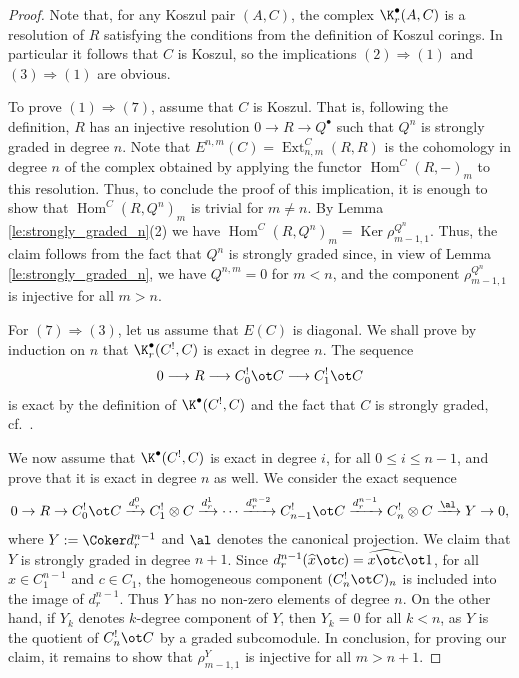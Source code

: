 \begin{proof}
Note that, for any Koszul pair $(A,C)$, the complex $\K^\bullet_r(A,C)$ is a resolution of $R$ sa\-tisfying the conditions from the def\/inition of Koszul corings. In particular it follows that $C$ is Koszul, so the implications $(2) \Longrightarrow (1)$ and $(3) \Longrightarrow (1)$ are obvious.

To prove $(1) \Longrightarrow (7)$, assume that $C$ is Koszul. That is, following the def\/inition, $R$ has an injective resolution $0 \rightarrow R \rightarrow Q^\bullet$ such that $Q^n$ is strongly graded in degree $n$. Note that $E^{n,m}(C)=\operatorname{Ext}_{n,m}^C(R,R)$ is the cohomology in degree $n$ of the complex obtained by applying the functor $\operatorname{Hom}^C(R,-)_m$ to this resolution. Thus, to conclude the proof of this implication, it is enough to show that $\operatorname{Hom}^C(R,Q^n)_m$ is trivial for $m\neq n$. By Lemma \ref{le:strongly_graded_n}(2) we have $\operatorname{Hom}^C(R,Q^n)_m=\operatorname{Ker}\rho^{Q^n}_{m-1,1}$. Thus, the claim follows from the fact that $Q^n$ is strongly graded since, in view of Lemma \ref{le:strongly_graded_n}, we have $Q^{n,m}=0$ for $m<n$, and the component $\rho^{Q^n}_{m-1,1}$ is injective for all $m>n$.

For $(7) \Longrightarrow (3)$, let us assume that $E(C)$ is diagonal. We shall prove by induction on $n$ that $\K_r^\bullet(C^!,C) $ is exact in degree $n$. The sequence
\begin{gather*}
 0\longrightarrow R\longrightarrow C_0^!\ot C\longrightarrow
 C_1^!\ot C
\end{gather*}
is exact by the def\/inition of $\K^\bullet(C^!,C)$ and the fact that $C$ is strongly graded, cf.\ \cite[Lemma~2.1]{jps}.


We now assume that $\K^\bullet(C^!,C)$ is exact in degree $i$, for all $0\leq i\leq n-1$, and prove that it is exact in degree $n$ as well. We consider the exact sequence
\begin{gather}\label{eq:sequenceC!}
 0 \rightarrow R \rightarrow C^!_0\ot C \xrightarrow{d^0_r} C_1^! \otimes C \xrightarrow{d^1_r} \cdots \xrightarrow{d^{n-2}_r} C^!_{n-1}\ot C \xrightarrow{d^{n-1}_r} C_n^! \otimes C \xrightarrow{\al}Y \rightarrow 0,
\end{gather}
where $Y:=\Coker d^{n-1}_r$ and $\al$ denotes the canonical projection. We claim that $Y$ is strongly graded in degree $n+1$. Since $d_r^{n-1}(\widehat{x}\ot c)= \widehat{x\ot c}\ot 1$, for all $x\in C_1^{n-1}$ and $c\in C_1$, the homogeneous component $(C_n^!\ot C)_n$ is included into the image of $d_r^{n-1}$. Thus $Y$ has no non-zero elements of degree $n$. On the other hand, if $Y_k$ denotes $k$-degree component of $Y$, then $Y_k=0$ for all $k<n$, as $Y$ is the quotient of $C_n^!\ot C$ by a graded subcomodule. In conclusion, for proving our claim, it remains to show that $\rho^Y_{m-1,1}$ is injective for all $m>n+1$.


\end{proof}
